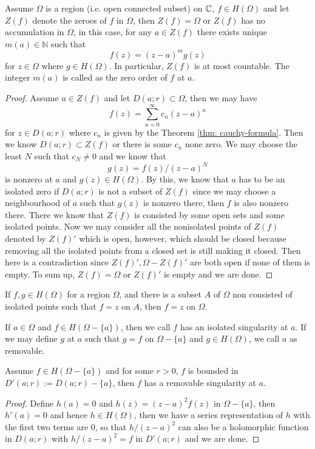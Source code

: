 \begin{theorem}
    Assume $\Omega$ is a region (i.e. open connected subset) on $\mathbb{C}$, $f\in H(\Omega)$ and let $Z(f)$ denote the zeroes of $f$ in $\Omega$, then $Z(f) = \Omega$ or $Z(f)$ has no accumulation in $\Omega$, in this case, for any $a\in Z(f)$ there exists unique $m(a) \in \mathbb N$ such that
    \[f(z) = (z-a)^{m}g(z)\]
    for $z\in \Omega$ where $g\in H(\Omega)$. In particular, $Z(f)$ is at most countable. The integer $m(a)$ is called as the zero order of $f$ at $a$.
\end{theorem}
\begin{proof}
    Assume $a \in Z(f)$ and let $D(a;r) \subset \Omega$, then we may have
    \[
    f(z) = \sum\limits_{n=0}^{\infty}
    c_n(z-a)^n
    \]
    for $z\in D(a;r)$ where $c_n$ is given by the Theorem \ref{thm: cauchy-formula}. Then we know $D(a;r) \subset Z(f)$ or there is some $c_n$ none zero. We may choose the least $N$ such that $c_N \neq 0$ and we know that
    \[
    g(z) = f(z)/(z-a)^N
    \]
    is nonzero at $a$ and $g(z) \in H(\Omega)$. By this, we know that $a$ has to be an isolated zero if $D(a;r)$ is not a subset of $Z(f)$ since we may choose a neighbourhood of $a$ such that $g(z)$ is nonzero there, then $f$ is also nonzero there. There we know that $Z(f)$ is consisted by some open sets and some isolated points. Now we may consider all the nonisolated points of $Z(f)$ denoted by $Z(f)'$ which is open, however, which should be closed because removing all the isolated points from a closed set is still making it closed. Then here is a contradiction since $Z(f)', \Omega - Z(f)'$ are both open if none of them is empty. To sum up, $Z(f) = \Omega$ or $Z(f)'$ is empty and we are done.
\end{proof}

\begin{corollary}
    If $f,g \in H(\Omega)$ for a region $\Omega$, and there is a subset $A$ of $\Omega$ non consisted of isolated points such that $f = z$ on $A$, then $f = z$ on $\Omega$.
\end{corollary}

\begin{definition}
     If $a\in \Omega$ and $f\in H(\Omega - \{a\})$, then we call $f$ has an isolated singularity at $a$. If we may define $g$ at $a$ such that $g=f$ on $\Omega - \{a\}$ and $g\in H(\Omega)$, we call $a$ as removable.
\end{definition}

\begin{theorem}
\label{thm: removable-singular}
    Assume $f\in H(\Omega-\{a\})$ and for some $r > 0$, $f$ is bounded in $D'(a;r):=D(a;r) - \{a\}$, then $f$ has a removable singularity at $a$.
\end{theorem}
\begin{proof}
    Define $h(a) = 0$ and $h(z) = (z-a)^2f(z)$ in $\Omega-\{a\}$, then $h'(a) = 0$ and hence $h \in H(\Omega)$, then we have a series representation of $h$ with the first two terms are $0$, so that $h/(z-a)^2$ can also be a holomorphic function in $D(a;r)$ with $h/(z-a)^2 = f$ in $D'(a;r)$ and we are done.
\end{proof}

